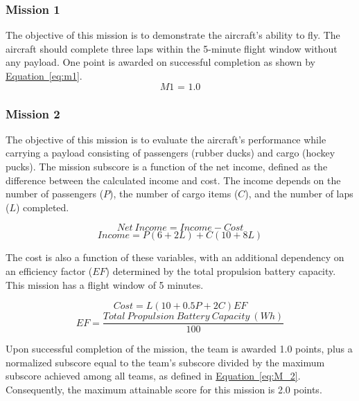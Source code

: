 \documentclass[10pt, letterpaper]{article}
\begin{document}
\subsubsection{Mission 1}
The objective of this mission is to demonstrate the aircraft’s ability to fly. The aircraft should complete three laps within the 5-minute flight window without any payload. One point is awarded on successful completion as shown by \hyperref[eq:m1]{Equation~\ref*{eq:m1}}.
\begin{equation}
\textit{M1 = 1.0}
\label{eq:m1}
\end{equation}
\subsubsection{Mission 2}
The objective of this mission is to evaluate the aircraft’s performance while carrying a payload consisting of passengers (rubber ducks) and cargo (hockey pucks). The mission subscore is a function of the net income, defined as the difference between the calculated income and cost. The income depends on the number of passengers ($P$), the number of cargo items ($C$), and the number of laps ($L$) completed.

\begin{equation}
\label{eq:net_income}
Net\ Income = Income - Cost
\end{equation}
\begin{equation}
\label{eq:income}
Income = P(6 + 2L) + C(10 + 8L)
\end{equation}

The cost is also a function of these variables, with an additional dependency on an efficiency factor ($EF$) determined by the total propulsion battery capacity. This mission has a flight window of 5 minutes.

\begin{equation}
\label{eq:cost}
Cost = L(10 + 0.5P + 2C)EF
\end{equation}
\begin{equation}
\label{eq:EF}
EF = \frac{Total\ Propulsion\ Battery\ Capacity\ (Wh)}{100}
\end{equation}

Upon successful completion of the mission, the team is awarded 1.0 points, plus a normalized subscore equal to the team’s subscore divided by the maximum subscore achieved among all teams, as defined in \hyperref[eq:M_2]{Equation~\ref*{eq:M_2}}. Consequently, the maximum attainable score for this mission is 2.0 points.

\setlength{\abovedisplayskip}{4pt}
\setlength{\belowdisplayskip}{4pt}
\end{document}
